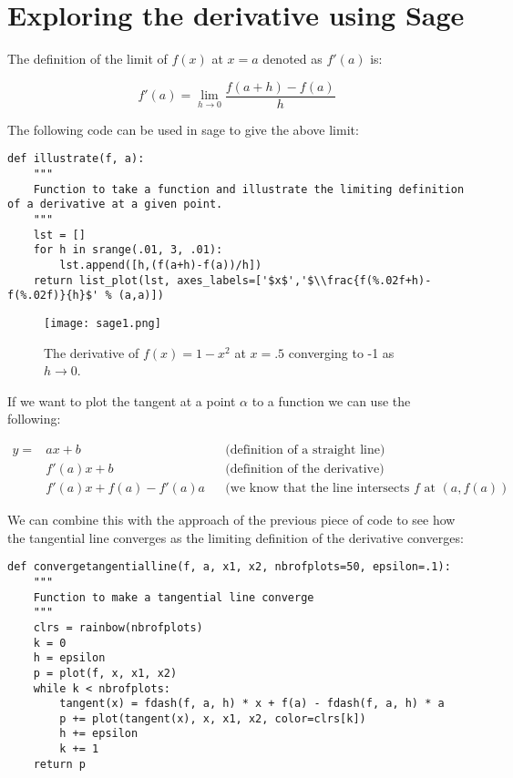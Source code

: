 \documentclass[11pt,letterpaper]{article}
\begin{document}
\section{Exploring the derivative using Sage}

The definition of the limit of $f(x)$ at $x=a$ denoted as $f'(a)$ is:

\begin{equation}
f'(a) = \lim_{h\to0}\frac{f(a+h)-f(a)}{h}
\end{equation}

The following code can be used in sage to give the above limit:

\begin{verbatim}
def illustrate(f, a):
    """
    Function to take a function and illustrate the limiting definition of a derivative at a given point.
    """
    lst = []
    for h in srange(.01, 3, .01):
        lst.append([h,(f(a+h)-f(a))/h])
    return list_plot(lst, axes_labels=['$x$','$\\frac{f(%.02f+h)-f(%.02f)}{h}$' % (a,a)])
\end{verbatim}

\begin{figure}[!htbp]
\begin{center}
\texttt{[image: sage1.png]}
\end{center}
\caption{The derivative of $f(x)=1-x^2$ at $x=.5$ converging to -1 as $h\to0$.}
\end{figure}

If we want to plot the tangent at a point $\alpha$ to a function we can use the following:

\begin{align}
y=&ax+b&&\text{(definition of a straight line)}\nonumber\\
  &f'(a)x+b&&\text{(definition of the derivative)}\nonumber\\
  &f'(a)x+f(a)-f'(a)a&&\text{(we know that the line intersects $f$ at $(a,f(a))$}\nonumber
\end{align}

We can combine this with the approach of the previous piece of code to see how the tangential line converges as the limiting definition of the derivative converges:

\begin{verbatim}
def convergetangentialline(f, a, x1, x2, nbrofplots=50, epsilon=.1):
    """
    Function to make a tangential line converge
    """
    clrs = rainbow(nbrofplots)
    k = 0
    h = epsilon
    p = plot(f, x, x1, x2)
    while k < nbrofplots:
        tangent(x) = fdash(f, a, h) * x + f(a) - fdash(f, a, h) * a
        p += plot(tangent(x), x, x1, x2, color=clrs[k])
        h += epsilon
        k += 1
    return p
\end{verbatim}
\end{document}
